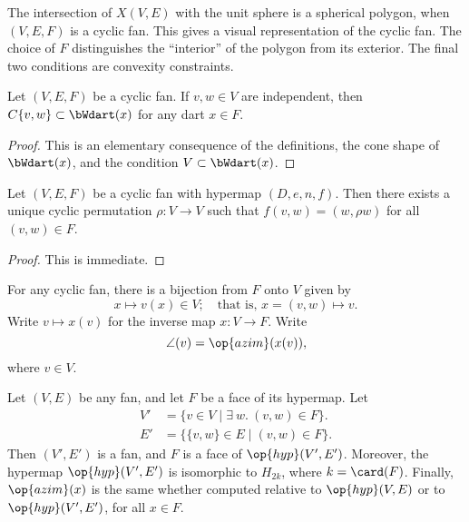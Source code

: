 The intersection of $X(V,E)$ with the unit sphere is a spherical polygon, when $(V,E,F)$ is a cyclic fan.  This gives a visual representation of the cyclic fan. The choice of $F$ distinguishes the ``interior'' of the polygon from its exterior.  The final two conditions are convexity constraints.

\begin{lemma}  Let $(V,E,F)$ be a cyclic fan.   If $v,w\in V$ are independent, then $C\{v,w\} \subset \bWdart(x)$ for any dart $x\in F$.
\end{lemma}
%

\begin{proof}  This is an elementary consequence of the definitions, the cone shape of $\bWdart(x)$,  and the condition $V\subset \bWdart(x)$.
\end{proof}

\begin{lemma}  Let $(V,E,F)$ be a cyclic fan with hypermap $(D,e,n,f)$.  Then there exists a unique cyclic permutation $\rho:V\to V$ such that
$f(v,w) = (w,\rho w)$ for all $(v,w)\in F$.
\end{lemma}
%

\begin{proof}  This is immediate.
\end{proof}

For any cyclic fan, there is a bijection from $F$ onto $V$ given by
$$x\mapsto v(x)\in V;\quad\text{that is, }  x = (v,w) \mapsto v.$$  
Write $v\mapsto x(v)$ for the inverse map $x:V\to F$.  Write
$$
\angle(v) = \op{azim}(x(v)),
$$
where $v\in V$.
%
%



\begin{lemma}[localization]\label{lemma:localization}  
Let $(V,E)$ be any fan, and let $F$ be a face of its hypermap.  
Let 
$$
\begin{array}{rll}
V' &= \{v\in V \mid \exists~w.~(v,w)\in F\}.\\
E' &= \{\{v,w\} \in E\mid (v,w)\in F\}.
\end{array}
$$
Then $(V',E')$ is a fan, and $F$ is a face of $\op{hyp}(V',E')$.  Moreover, the hypermap $\op{hyp}(V',E')$ is isomorphic
to $H_{2k}$, where $k= \card(F)$.
 Finally, $\op{azim}(x)$ is the same
whether computed relative to $\op{hyp}(V,E)$ or to $\op{hyp}(V',E')$, for all $x\in F$.
\end{lemma}

